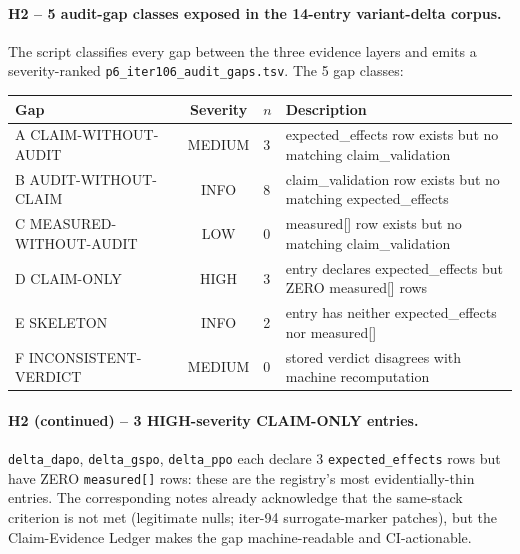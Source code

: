 \documentclass{article}
\begin{document}
\paragraph{H2 -- 5 audit-gap classes exposed in the 14-entry variant-delta corpus.}
The script classifies every gap between the three evidence layers and emits
a severity-ranked \texttt{p6\_iter106\_audit\_gaps.tsv}. The 5 gap classes:

\begin{tabular}{lcll}
\hline
Gap & Severity & $n$ & Description \\
\hline
A CLAIM-WITHOUT-AUDIT    & MEDIUM & 3 & expected\_effects row exists but no matching claim\_validation \\
B AUDIT-WITHOUT-CLAIM    & INFO   & 8 & claim\_validation row exists but no matching expected\_effects \\
C MEASURED-WITHOUT-AUDIT & LOW    & 0 & measured[] row exists but no matching claim\_validation \\
D CLAIM-ONLY             & HIGH   & 3 & entry declares expected\_effects but ZERO measured[] rows \\
E SKELETON               & INFO   & 2 & entry has neither expected\_effects nor measured[] \\
F INCONSISTENT-VERDICT   & MEDIUM & 0 & stored verdict disagrees with machine recomputation \\
\hline
\end{tabular}

\paragraph{H2 (continued) -- 3 HIGH-severity CLAIM-ONLY entries.}
\texttt{delta\_dapo}, \texttt{delta\_gspo}, \texttt{delta\_ppo} each declare
3 \texttt{expected\_effects} rows but have ZERO \texttt{measured[]} rows:
these are the registry's most evidentially-thin entries. The corresponding
notes already acknowledge that the same-stack criterion is not met
(legitimate nulls; iter-94 surrogate-marker patches), but the Claim-Evidence
Ledger makes the gap machine-readable and CI-actionable.
\end{document}
